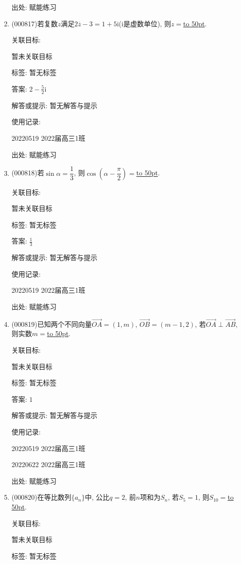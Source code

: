 \documentclass[10pt,a4paper]{article}
\newcommand{\blank}[1]{\underline{\hbox to #1pt{}}}
\begin{document}
\begin{enumerate}[1.]
出处: 赋能练习
\item { (000817)}若复数$z$满足$2 \overline z-3=1+5 \mathrm{i}$($\mathrm{i}$是虚数单位), 则$z=$\blank{50}.


关联目标:

暂未关联目标



标签: 暂无标签

答案: $2-\frac 52\mathrm{i}$

解答或提示: 暂无解答与提示

使用记录:

20220519	2022届高三1班	


出处: 赋能练习
\item { (000818)}若$\sin\alpha =\dfrac13$, 则$\cos(\alpha -\dfrac{\pi}2)=$\blank{50}.


关联目标:

暂未关联目标



标签: 暂无标签

答案: $\frac 13$

解答或提示: 暂无解答与提示

使用记录:

20220519	2022届高三1班	


出处: 赋能练习
\item { (000819)}已知两个不同向量$\overrightarrow{OA}=(1,m)$, $\overrightarrow{OB}=(m-1,2)$, 若$\overrightarrow{OA}\perp \overrightarrow{AB}$, 则实数$m=$\blank{50}.


关联目标:

暂未关联目标



标签: 暂无标签

答案: $1$

解答或提示: 暂无解答与提示

使用记录:

20220519	2022届高三1班	

20220622	2022届高三1班  	


出处: 赋能练习
\item { (000820)}在等比数列$\{a_n\}$中, 公比$q=2$, 前$n$项和为$S_n$, 若$S_5=1$, 则$S_{10}=$\blank{50}.


关联目标:

暂未关联目标



标签: 暂无标签


\end{enumerate}
\end{document}
